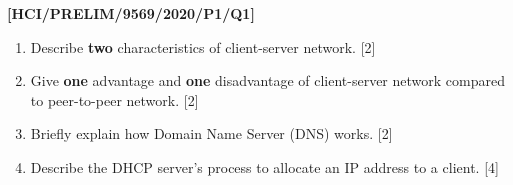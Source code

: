 \item \textbf{{[}HCI/PRELIM/9569/2020/P1/Q1{]} }
\begin{enumerate}
\item Describe \textbf{two} characteristics of client-server network. \hfill{}{[}2{]}
\item Give \textbf{one} advantage and \textbf{one} disadvantage of client-server
network compared to peer-to-peer network. \hfill{}{[}2{]}
\item Briefly explain how Domain Name Server (DNS) works. \hfill{}{[}2{]}
\item Describe the DHCP server\textquoteright s process to allocate an IP
address to a client. \hfill{}{[}4{]}
\end{enumerate}